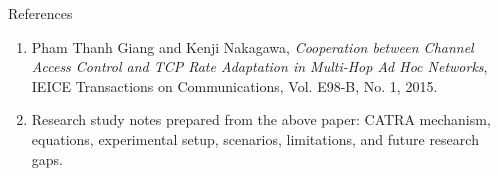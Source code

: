 \begin{frame}{References}

\begin{enumerate}
    \item Pham Thanh Giang and Kenji Nakagawa, \textit{Cooperation between Channel Access Control and TCP Rate Adaptation in Multi-Hop Ad Hoc Networks}, IEICE Transactions on Communications, Vol. E98-B, No. 1, 2015.

    \item Research study notes prepared from the above paper: CATRA mechanism, equations, experimental setup, scenarios, limitations, and future research gaps.
\end{enumerate}
\end{frame}
